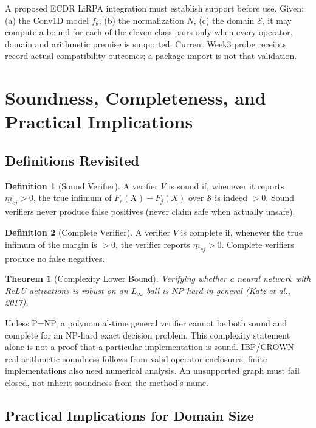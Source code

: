 \documentclass[11pt, a4paper]{article}
\theoremstyle{definition}
\newtheorem{definition}{Definition}[section]
\theoremstyle{plain}
\newtheorem{theorem}{Theorem}[section]
\newcommand{\mbm}[1]{\underline{m}_{#1}}
\begin{document}
A proposed ECDR LiRPA integration must establish support before use. Given:
(a) the Conv1D model $f_\theta$,
(b) the normalization $N$,
(c) the domain $\mathcal{S}$,
it may compute a bound for each of the eleven class pairs only when every operator, domain and arithmetic premise is supported. Current Week3 probe receipts record actual compatibility outcomes; a package import is not that validation.

\section{Soundness, Completeness, and Practical Implications}

\subsection{Definitions Revisited}

\begin{definition}[Sound Verifier]
  A verifier $V$ is sound if, whenever it reports $\mbm{cj} > 0$,
  the true infimum of $F_c(X) - F_j(X)$ over $\mathcal{S}$ is indeed $> 0$.
  Sound verifiers never produce false positives (never claim safe when actually unsafe).
\end{definition}

\begin{definition}[Complete Verifier]
  A verifier $V$ is complete if, whenever the true infimum of the margin is $> 0$,
  the verifier reports $\mbm{cj} > 0$. Complete verifiers produce no false negatives.
\end{definition}

\begin{theorem}[Complexity Lower Bound]
  Verifying whether a neural network with ReLU activations is robust on an
  $L_\infty$ ball is NP-hard in general (Katz et al., 2017).
\end{theorem}

Unless P=NP, a polynomial-time general verifier cannot be both sound and
complete for an NP-hard exact decision problem. This complexity statement
alone is not a proof that a particular implementation is sound. IBP/CROWN
real-arithmetic soundness follows from valid operator enclosures; finite
implementations also need numerical analysis. An unsupported graph must fail
closed, not inherit soundness from the method's name.

\subsection{Practical Implications for Domain Size}
\end{document}
